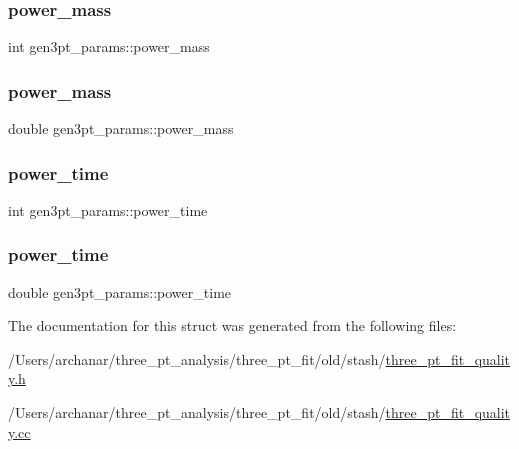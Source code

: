 \subsubsection{\texorpdfstring{power\_mass}{power\_mass}\hspace{0.1cm}{\footnotesize\ttfamily [1/2]}}
{\footnotesize\ttfamily int gen3pt\+\_\+params\+::power\+\_\+mass}

\mbox{\label{structgen3pt__params_aeaf52e6a42d7afda3c63fe66d371de1c}} 
\subsubsection{\texorpdfstring{power\_mass}{power\_mass}\hspace{0.1cm}{\footnotesize\ttfamily [2/2]}}
{\footnotesize\ttfamily double gen3pt\+\_\+params\+::power\+\_\+mass}

\mbox{\label{structgen3pt__params_af6d428fb1762465fd5fb3b1579f644c3}} 
\subsubsection{\texorpdfstring{power\_time}{power\_time}\hspace{0.1cm}{\footnotesize\ttfamily [1/2]}}
{\footnotesize\ttfamily int gen3pt\+\_\+params\+::power\+\_\+time}

\mbox{\label{structgen3pt__params_a10354938445a153a8e6505d4b1162ccc}} 
\subsubsection{\texorpdfstring{power\_time}{power\_time}\hspace{0.1cm}{\footnotesize\ttfamily [2/2]}}
{\footnotesize\ttfamily double gen3pt\+\_\+params\+::power\+\_\+time}



The documentation for this struct was generated from the following files\+:\begin{DoxyCompactItemize}
\item 
/\+Users/archanar/three\+\_\+pt\+\_\+analysis/three\+\_\+pt\+\_\+fit/old/stash/\mbox{\hyperlink{old_2stash_2three__pt__fit__quality_8h}{three\+\_\+pt\+\_\+fit\+\_\+quality.\+h}}\item 
/\+Users/archanar/three\+\_\+pt\+\_\+analysis/three\+\_\+pt\+\_\+fit/old/stash/\mbox{\hyperlink{old_2stash_2three__pt__fit__quality_8cc}{three\+\_\+pt\+\_\+fit\+\_\+quality.\+cc}}\end{DoxyCompactItemize}
